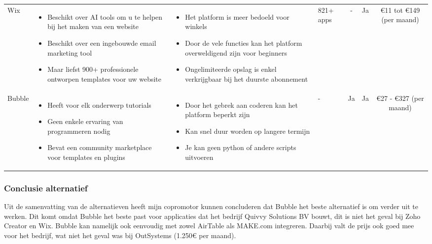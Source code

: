 \begin{longtable}{p{2.2cm} p{2.4cm} p{2.4cm} p{2.2cm} c c c}
    Wix & 
    \begin{itemize}

        \item Beschikt over AI tools om u te helpen bij het maken van een website
        \item Beschikt over een ingebouwde email marketing tool
        \item Maar liefst 900+ professionele ontworpen templates voor uw website
    \end{itemize} & 
    \begin{itemize}
        \item Het platform is meer bedoeld voor winkels
        \item Door de vele functies kan het platform overweldigend zijn voor beginners
        \item Ongelimiteerde opslag is enkel verkrijgbaar bij het duurste abonnement
    \end{itemize} &
    821+ apps &
    - &
    Ja &
    €11 tot €149 (per maand)\\

    Bubble & 
    \begin{itemize}
        \item Heeft voor elk onderwerp tutorials
        \item Geen enkele ervaring van programmeren nodig
        \item Bevat een community marketplace voor templates en plugins
    \end{itemize} & 
    \begin{itemize}
        \item Door het gebrek aan coderen kan het platform beperkt zijn
        \item Kan snel duur worden op langere termijn
        \item Je kan geen python of andere scripts uitvoeren
    \end{itemize} &
    - &
    Ja &
    Ja &
    €27 - €327 (per maand)\\
\end{longtable}

\subsubsection*{Conclusie alternatief}
Uit de samenvatting van de alternatieven heeft mijn copromotor kunnen concluderen dat Bubble het beste alternatief is om verder uit te werken.
Dit komt omdat Bubble het beste past voor applicaties dat het bedrijf Quivvy Solutions BV bouwt, dit is niet het geval bij Zoho Creator en Wix. 
Bubble kan namelijk ook eenvoudig met zowel AirTable als MAKE.com integreren. Daarbij valt de prijs ook goed mee voor het bedrijf, wat niet het geval was bij OutSystems (1.250€ per maand).


